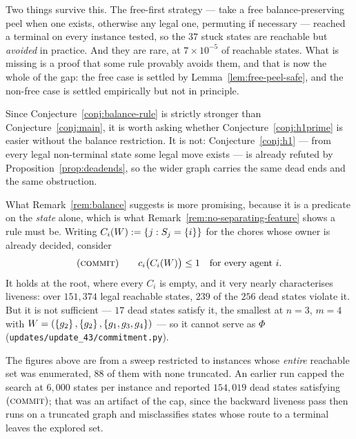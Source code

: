 Two things survive this. The free-first strategy --- take a free
balance-preserving peel when one exists, otherwise any legal one, permuting if
necessary --- reached a terminal on every instance tested, so the $37$ stuck
states are reachable but \emph{avoided} in practice. And they are rare, at
$7 \times 10^{-5}$ of reachable states. What is missing is a proof that some rule
provably avoids them, and that is now the whole of the gap: the free case is
settled by Lemma~\ref{lem:free-peel-safe}, and the non-free case is settled
empirically but not in principle.

\begin{remark}
\label{rem:commit-predicate}
Since Conjecture~\ref{conj:balance-rule} is strictly stronger than
Conjecture~\ref{conj:main}, it is worth asking whether
Conjecture~\ref{conj:h1prime} is easier without the balance restriction. It is
not: Conjecture~\ref{conj:h1} --- from every legal non-terminal state some legal
move exists --- is already refuted by Proposition~\ref{prop:deadends}, so the
wider graph carries the same dead ends and the same obstruction.

What Remark~\ref{rem:balance} suggests is more promising, because it is a
predicate on the \emph{state} alone, which is what
Remark~\ref{rem:no-separating-feature} shows a rule must be. Writing
$C_i(W) := \left\{j : S_j = \left\{i\right\}\right\}$ for the chores whose owner is
already decided, consider
\[
  (\textsc{commit}) \qquad c_i\bigl(C_i(W)\bigr) \le 1
  \quad \text{for every agent } i .
\]
It holds at the root, where every $C_i$ is empty, and it very nearly
characterises liveness: over $151{,}374$ legal reachable states, $239$ of the
$256$ dead states violate it. But it is not sufficient --- $17$ dead states
satisfy it, the smallest at $n = 3$, $m = 4$ with
$W = (\left\{g_2\right\},\left\{g_2\right\},\left\{g_1,g_3,g_4\right\})$ --- so it cannot serve
as $\Phi$ (\texttt{updates/update\_43/commitment.py}).

The figures above are from a sweep restricted to instances whose \emph{entire}
reachable set was enumerated, $88$ of them with none truncated. An earlier run
capped the search at $6{,}000$ states per instance and reported $154{,}019$ dead
states satisfying $(\textsc{commit})$; that was an artifact of the cap, since the
backward liveness pass then runs on a truncated graph and misclassifies states
whose route to a terminal leaves the explored set.
\end{remark}

